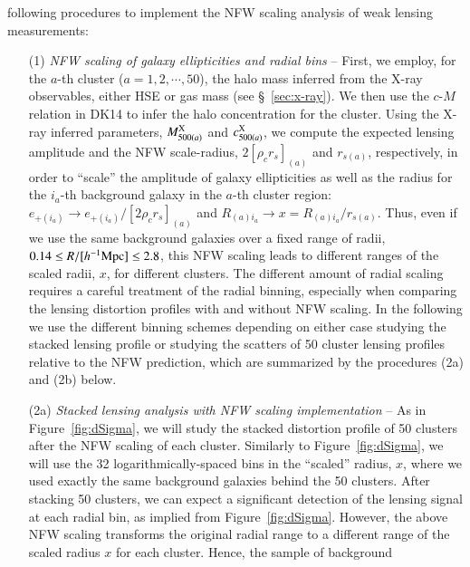\documentclass[iop, apj]{emulateapj}
\newcommand{\?}{\stackrel{?}{=}}
\begin{document}
following procedures to implement the NFW scaling analysis of weak
lensing measurements: 
%
\begin{itemize}
 \item[(1)] {\it NFW scaling of galaxy ellipticities and radial bins} --
	    First, we employ, for the $a$-th cluster
	    ($a=1,2,\cdots,50$), the halo mass inferred from the X-ray
	    observables,
       either HSE or gas mass (see \S~\ref{sec:x-ray}). We then use the
	    $c$-$M$
       relation in DK14 to infer the halo
       concentration for the cluster. Using the X-ray inferred
       parameters, $M_{500(a)}^{\rm X}$ and
       $c^{\rm X}_{500(a)}$, we compute
       the expected lensing amplitude and the NFW scale-radius,
	    $2[\rho_c
       r_s]_{(a)}$ and $r_{s(a)}$, respectively, in order to ``scale''
       the amplitude of galaxy ellipticities as well as the
       radius for the $i_a$-th
	    background
       galaxy in the $a$-th cluster region: $e_{+(i_a)}\rightarrow
	    e_{+(i_a)}/[2\rho_c r_s]_{(a)}$
       and $R_{(a)i_a}\rightarrow x=R_{(a)i_a}/r_{s(a)}$. Thus, even if we
       use the same background galaxies over a
       fixed range of radii, $0.14\le R/[h^{-1}{\rm Mpc}]\le 2.8$, this
	    NFW scaling leads to different ranges of
       the scaled radii, $x$, for different clusters. The
       different amount of radial scaling requires a careful treatment
       of the radial binning, especially when comparing the lensing
       distortion profiles with and without NFW scaling. In the
following we use the different binning schemes depending on either case
	    studying the stacked lensing profile or studying the
	    scatters of 50 cluster lensing profiles relative to the NFW
	    prediction, which are summarized by the procedures (2a) and
	    (2b) below.
 \item[(2a)] {\it Stacked lensing analysis with NFW scaling
       implementation} -- As in Figure~\ref{fig:dSigma}, we will study
       the stacked distortion profile of 50 clusters after the NFW
       scaling of each cluster. Similarly to Figure~\ref{fig:dSigma}, we
	    will use the 32
       logarithmically-spaced bins in the ``scaled'' radius, $x$, where
	    we used exactly the same background
       galaxies behind the 50 clusters.  After stacking 50 clusters, we
       can expect a significant detection of the lensing signal at each
       radial bin, as implied from Figure~\ref{fig:dSigma}. However, the
	    above
       NFW scaling transforms the original radial range to a different
      range of the scaled radius $x$ for each cluster. Hence, the sample of background

\end{itemize}
\end{document}
